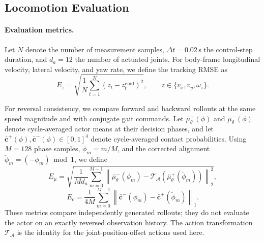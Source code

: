 %
%

\subsection{Locomotion Evaluation}
\label{sec:locomotion_evaluation}

\paragraph{Evaluation metrics.}
Let $N$ denote the number of measurement samples, $\Delta t=0.02\,\mathrm{s}$ the control-step duration, and $d_a=12$ the number of actuated joints. For body-frame longitudinal velocity, lateral velocity, and yaw rate, we define the tracking RMSE as
\begin{equation}
    E_z=\sqrt{\frac{1}{N}\sum_{t=1}^{N}\left(z_t-z_t^{\mathrm{cmd}}\right)^2},
    \qquad z\in\{v_x,v_y,\omega_z\}.
    \label{eq:loco_tracking_rmse}
\end{equation}

For reversal consistency, we compare forward and backward rollouts at the same speed magnitude and with conjugate gait commands. Let $\bar\mu_\theta^{+}(\phi)$ and $\bar\mu_\theta^{-}(\phi)$ denote cycle-averaged actor means at their decision phases, and let $\bar{\mathbf c}^{+}(\phi),\bar{\mathbf c}^{-}(\phi)\in[0,1]^4$ denote cycle-averaged contact probabilities. Using $M=128$ phase samples, $\phi_m=m/M$, and the corrected alignment $\check\phi_m=(-\phi_m)\bmod 1$, we define
\begin{equation}
    E_\mu=\sqrt{\frac{1}{M d_a}\sum_{m=0}^{M-1}
    \left\|\bar\mu_\theta^{-}(\phi_m)-\mathcal T_{\mathcal A}\!\left(\bar\mu_\theta^{+}(\check\phi_m)\right)\right\|_2^2},
    \label{eq:loco_actor_reversal}
\end{equation}
\begin{equation}
    E_c=\frac{1}{4M}\sum_{m=0}^{M-1}
    \left\|\bar{\mathbf c}^{-}(\phi_m)-\bar{\mathbf c}^{+}(\check\phi_m)\right\|_1.
    \label{eq:loco_contact_reversal}
\end{equation}
These metrics compare independently generated rollouts; they do not evaluate the actor on an exactly reversed observation history. The action transformation $\mathcal T_{\mathcal A}$ is the identity for the joint-position-offset actions used here.

